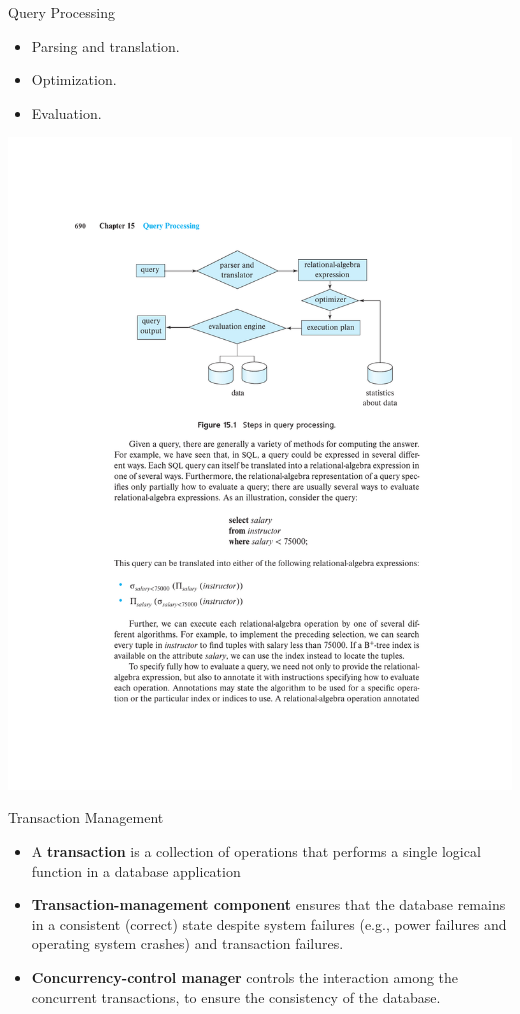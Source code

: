 \documentclass{beamer}
\begin{document}
\begin{frame}{Query Processing}
    \begin{itemize}
        \item Parsing and translation.
        \item Optimization.
        \item Evaluation.
    \end{itemize}
    \centering 
    \includegraphics[width=\textwidth, trim={5.25cm 16.25cm 4.9cm 4.5cm}, clip]{figures/qp}
\end{frame}

\begin{frame}{Transaction Management	}
    \begin{itemize}
        \item A \textbf{transaction} is a collection of operations that performs a single logical function in a database application
        \item \textbf{Transaction-management component} ensures that the database remains in a consistent (correct) state despite system failures (e.g., power failures and operating system crashes) and transaction failures.
        \item \textbf{Concurrency-control manager} controls the interaction among the concurrent transactions, to ensure the consistency of the database.
    \end{itemize}
\end{frame}
\end{document}
